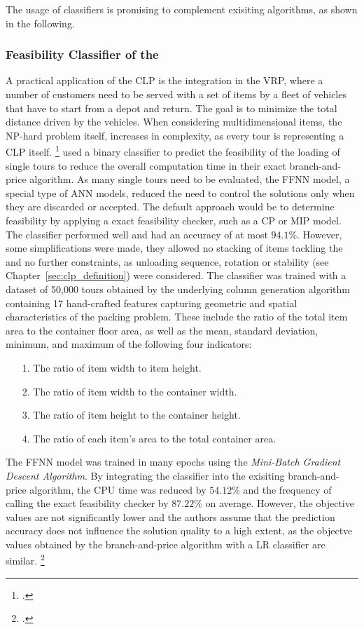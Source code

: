 The usage of classifiers is promising to complement exisiting algorithms, as shown in the following.


\subsubsection{Feasibility Classifier of the }
A practical application of the \gls{CLP} is the integration in the \gls{VRP}, where
a number of customers need to be served with a set of items by a fleet of vehicles that have
to start from a depot and return. The goal is to minimize the total distance driven
by the vehicles. When considering multidimensional items, the NP-hard problem itself,
increases in complexity, as every tour is representing a \gls{CLP} itself. \footcite[cf.][pp. 1--2]{tamke_branch-and-cut_2024}
\textcite{zhang_learning-based_2022} used a binary classifier to predict the feasibility of the
loading of single tours to reduce the overall computation time in their exact branch-and-price
algorithm. As many single tours need to be evaluated, the \gls{FFNN} model, a special type of \gls{ANN} models, reduced the need
to control the solutions only when they are discarded or accepted. The default approach would be to
determine feasibility by applying a exact feasibility checker, such as a \gls{CP} or \gls{MIP} model.
The classifier performed well and had an accuracy of at most $94.1\%$. However, some simplifications were made,
they allowed no stacking of items tackling the  and no further constraints,
as unloading sequence, rotation or stability (see Chapter~\ref{sec:clp_definition}) were considered.
The classifier was trained with a dataset of 50,000 tours obtained by the underlying column generation
algorithm containing 17 hand-crafted features capturing geometric
and spatial characteristics of the packing problem. These include the ratio of the total item area
to the container floor area, as well as the mean, standard deviation, minimum, and maximum of
the following four indicators:
\begin{itemize}
    \item[1.] The ratio of item width to item height.
    \item[2.] The ratio of item width to the container width.
    \item[3.] The ratio of item height to the container height.
    \item[4.] The ratio of each item’s area to the total container area.
\end{itemize}
The \gls{FFNN} model was trained in many epochs
using the \textit{Mini-Batch Gradient Descent Algorithm}. By integrating the classifier into the
exisiting branch-and-price algorithm, the CPU time was reduced by $54.12\%$ and the frequency of
calling the exact feasibility checker by $87.22\%$ on average. However, the objective values are not significantly
lower and the authors assume that the prediction accuracy does not influence the solution quality
to a high extent, as the objectve values obtained by the branch-and-price algorithm with a \gls{LR} classifier are similar. \footcite[cf.][pp. 4, 9--15]{zhang_learning-based_2022}

